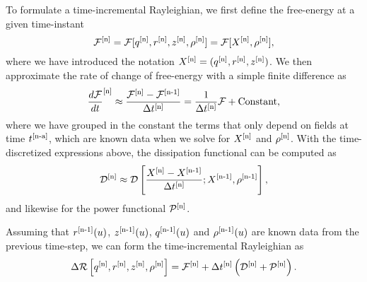 To formulate a time-incremental Rayleighian, we first define the free-energy at a given time-instant
\begin{equation}
 \mathcal{F}^{[\textup{n}]} = \mathcal{F}[q^{[\textup{n}]}, r^{[\textup{n}]}, z^{[\textup{n}]}, \rho^{[\textup{n}]}] = \mathcal{F}[X^{[\textup{n}]}, \rho^{[\textup{n}]}],
\end{equation}
where we have introduced the notation $X^{[\textup{n}]} = (q^{[\textup{n}]}, r^{[\textup{n}]}, z^{[\textup{n}]})$. We then approximate the rate of change of free-energy with a simple finite difference as
\begin{align}
\frac{d \mathcal{F}}{dt}^{[\textup{n}]} \approx   \frac{\mathcal{F}^{[\textup{n}]} - \mathcal{F}^{[\textup{n-1}]}}{\Delta t^{[\textup{n}]}}  = \frac{1}{\Delta t^{[\textup{n}]}}  \mathcal{F} + \mbox{Constant}, 
\end{align}
where we have grouped in the constant the terms that only depend on fields at time $t^{[\textup{n-a}]}$, which are known data when we solve for $X^{[\textup{n}]}$ and  $\rho^{[\textup{n}]}$. With the time-discretized expressions above, the dissipation functional can be computed as
\begin{align} 
   \mathcal{D}^{[\textup{n}]}  \approx \mathcal{D}\left[
   \frac{X^{[\textup{n}]} - X^{[\textup{n-1}]}}{\Delta t^{[\textup{n}]}}; X^{[\textup{n-1}]}  , \rho^{[\textup{n-1}]}\right],
\end{align}
and likewise for the power functional $\mathcal{P}^{[\textup{n}]}$. 

Assuming that $r^{[\textup{n-1}]}(u)$, $z^{[\textup{n-1}]}(u)$, $q^{[\textup{n-1}]}(u)$ and $\rho^{[\textup{n-1}]}(u)$ are known data from the previous time-step, we can form the time-incremental Rayleighian as  
\begin{equation}\label{R_incr}
\Delta \mathcal{R}\left[q^{[\textup{n}]}, r^{[\textup{n}]}, z^{[\textup{n}]}, \rho^{[\textup{n}]}\right] =  \mathcal{F}^{[\textup{n}]} +  \Delta t^{[\textup{n}]} \left(\mathcal{D}^{[\textup{n}]} + \mathcal{P}^{[\textup{n}]}\right).
\end{equation}

